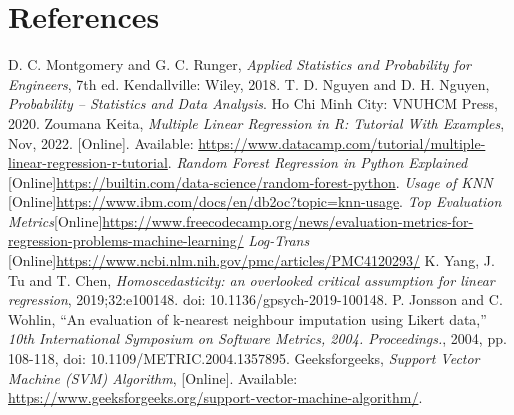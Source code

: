\documentclass[a4paper]{article}
\theoremstyle{definition}
\begin{document}
\section{References}
\begin{thebibliography}{9}
     D. C. Montgomery and G. C. Runger, \emph{Applied Statistics and Probability for Engineers}, 7th ed. Kendallville: Wiley, 2018.
     T. D. Nguyen and D. H. Nguyen, \emph{Probability – Statistics and Data Analysis}. Ho Chi Minh City: VNUHCM Press, 2020.
     Zoumana Keita, \emph{Multiple Linear Regression in R: Tutorial With Examples}, Nov, 2022. [Online]. Available: \href{https://www.datacamp.com/tutorial/multiple-linear-regression-r-tutorial}{https://www.datacamp.com/tutorial/multiple-linear-regression-r-tutorial}.
     \emph{Random Forest Regression in Python Explained } [Online]\href{https://builtin.com/data-science/random-forest-python}{https://builtin.com/data-science/random-forest-python}.
     \emph{Usage of KNN }[Online]\href{https://www.ibm.com/docs/en/db2oc?topic=knn-usage}{https://www.ibm.com/docs/en/db2oc?topic=knn-usage}.
     \emph{Top Evaluation Metrics}[Online]\href{https://www.freecodecamp.org/news/evaluation-metrics-for-regression-problems-machine-learning/}{https://www.freecodecamp.org/news/evaluation-metrics-for-regression-problems-machine-learning/} 
     \emph{Log-Trans}
    [Online]\href{https://www.ncbi.nlm.nih.gov/pmc/articles/PMC4120293/}{https://www.ncbi.nlm.nih.gov/pmc/articles/PMC4120293/}
     K. Yang, J. Tu and T. Chen, \emph{Homoscedasticity: an overlooked critical assumption for linear regression}, 2019;32:e100148. doi: 10.1136/gpsych-2019-100148.
     P. Jonsson and C. Wohlin, “An evaluation of k-nearest neighbour imputation using Likert data,” \emph{10th International Symposium on Software Metrics, 2004. Proceedings.}, 2004, pp. 108-118, doi: 10.1109/METRIC.2004.1357895.
     Geeksforgeeks, \emph{Support Vector Machine (SVM) Algorithm}, [Online]. Available: \href{https://www.geeksforgeeks.org/support-vector-machine-algorithm/}{https://www.geeksforgeeks.org/support-vector-machine-algorithm/}.
    
\end{thebibliography}
\end{document}
